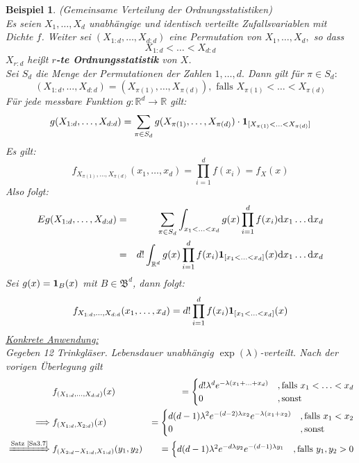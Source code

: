 \documentclass[a4paper,11pt]{book}
\newcommand{\R}{{\mathbb R}}
\newcommand{\ind}{\text{\bf{1}}}
\def\BB{ \mathfrak{B} }
\def\folgt{\ensuremath{\implies}}
\newcommand{\folgtnach}[1]{\ensuremath{\DOTSB\;\xRightarrow{\text{#1}}\;}}
\def\d{\mbox{d}}
\newtheorem{Bsp}{Beispiel}[chapter]
\theoremstyle{nonumberplain}
\begin{document}
\begin{Bsp} \label{Bsp3.5} (Gemeinsame Verteilung der Ordnungsstatistiken)\\
Es seien $X_1,\ldots,X_d$ unabhängige und identisch verteilte Zufallsvariablen mit Dichte $f$. Weiter sei $(X_{1:d}, \ldots, X_{d:d})$ eine Permutation von $X_1, \ldots,X_d,$ so dass
$$X_{1:d}<\ldots<X_{d:d}$$
$X_{r:d}$ heißt \textbf{$r$-te Ordnungsstatistik}  von $X$.\\
Sei $S_d$ die Menge der Permutationen der Zahlen $1,\ldots, d.$ Dann gilt für $\pi\in S_d:$
$$(X_{1:d},\ldots,X_{d:d})=(X_{\pi(1)},\ldots, X_{\pi(d)}), \text{ falls } X_{\pi(1)}<\ldots<X_{\pi(d)}$$
Für jede messbare Funktion $g:\R^d\to\R$ gilt:
$$g(X_{1:d},\ldots,X_{d:d})=\sum_{\pi\in S_d}g(X_{\pi(1)},\ldots,X_{\pi(d)})\cdot\ind_{[X_{\pi(1)}<\ldots<X_{\pi(d)}]}$$
Es gilt:
$$f_{X_{\pi(1)},\ldots,X_{\pi(d)}}(x_1,\ldots,x_d)=\prod_{i=1}^d f(x_i) = f_X(x)$$
Also folgt:
\begin{eqnarray*}
Eg(X_{1:d},\ldots,X_{d:d})&=&\sum_{\pi\in S_d}\int_{x_1<\ldots<x_d} g(x)\prod_{i=1}^d f(x_i)\d x_1\ldots\d x_d\\
&=&d!\int_{\R^d}g(x)\prod_{i=1}^d f(x_i)\ind_{[x_1<\ldots<x_d]}(x)\d x_1\ldots\d x_d\\
\end{eqnarray*}
Sei $g(x)=\ind_B(x)$ mit $B\in\BB^d$, dann folgt:
$$f_{X_{1:d},\ldots,X_{d:d}}(x_1,\ldots,x_d)=d!\prod_{i=1}^d f(x_i)\ind_{[x_1<\ldots <x_d]}(x)$$
\underline{Konkrete Anwendung:}\\
Gegeben 12 Trinkgläser. Lebensdauer unabhängig $\exp(\lambda)$-verteilt. Nach der vorigen Überlegung gilt
\begin{eqnarray*}
&f_{(X_{1:d},\ldots,X_{d:d})}(x)&=\begin{cases}
d!\lambda^d e^{-\lambda(x_1+\ldots+x_d)} &,\text{falls } x_1<\ldots<x_d\\
0&,\text{sonst}
\end{cases}\\
\folgt&f_{(X_{1:d},X_{2:d})}(x)&=\begin{cases}
d(d-1)\lambda^2 e^{-(d-2)\lambda x_2} e^{-\lambda(x_1+x_2)} &,\text{falls } x_1<x_2\\
0&,\text{sonst}
\end{cases}\\
\folgtnach{Satz \ref{Sa3.7}}&f_{(X_{2:d}-X_{1:d},X_{1:d})}(y_1,y_2)&=\begin{cases}
d(d-1)\lambda^2 e^{-d\lambda y_2} e^{-(d-1)\lambda y_1} &,\text{falls } y_1,y_2>0\\

\end{cases}
\end{eqnarray*}
\end{Bsp}
\end{document}
